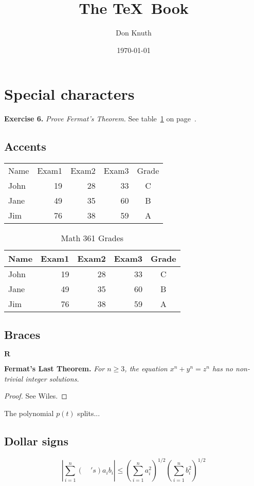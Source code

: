 \documentclass[a4paper,12pt]{article}
\author{Don Knuth}
\title{The \TeX\ Book}
\date{\today}
\begin{document}
\maketitle
\section{Special characters}

\textbf{Exercise 6.} \textit{Prove Fermat's Theorem.}
See table~\ref{tab:test} on page~\pageref{tab:test}.
\subsection{Accents}
\begin{tabular}{l r r r c} 
Name&Exam1&Exam2&Exam3&Grade\\
John&19& 28&33&C \\
Jane&49& 35&60&B  \\
Jim&76& 38&59&A 
\end{tabular}

\begin{table}
\begin{center}
\begin{tabular}{| l || r | r | r | c |}  
\hline
Name&Exam1&Exam2&Exam3&Grade\\
\hline\hline
John&19& 28&33&C \\  
\hline
Jane&49& 35&60&B  \\
\hline
Jim&76& 38&59&A  \\
\hline
\end{tabular}
\caption{Math 361 Grades\label{tab:test}} 
\end{center}
\end{table}

\subsection{Braces}
$\mathbf{R}$

\smallskip
\noindent\textbf{Fermat's Last Theorem.}
\textit{For $n\ge3$, 
the equation $x^n+y^n=z^n$ has no non-trivial integer solutions.}
\smallskip
\begin{proof} See Wiles.
\end{proof}

\begin{itshape}
The polynomial $p(t)$ splits...
\end{itshape}

\subsection{Dollar signs}
\[
\left|\sum_{i=1}^n (\quad's) a_ib_i\right|
\le
\left(\sum_{i=1}^n a_i^2\right)^{1/2}
\left(\sum_{i=1}^n b_i^2\right)^{1/2}
\]
\end{document}
